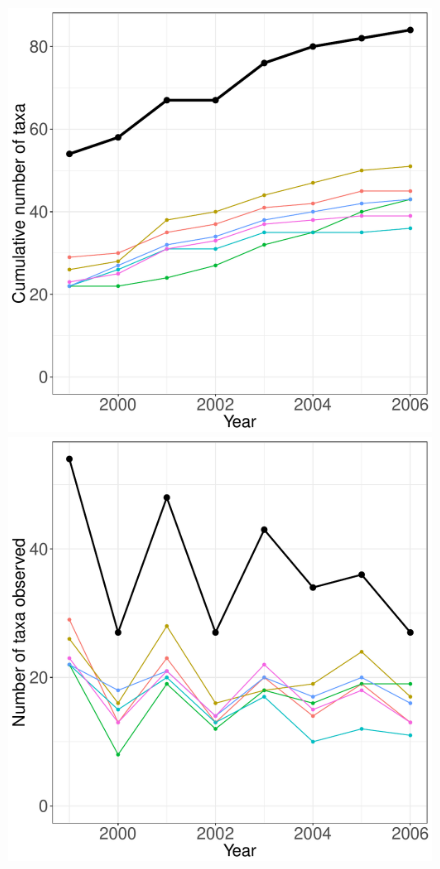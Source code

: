 \documentclass[11pt, oneside]{article}
\begin{document}
\begin{figure}[h!]
\centering
\includegraphics[scale = 0.4]{sgs-plants-catano_species_accumulation_curve.pdf}
\includegraphics[scale = 0.4]{sgs-plants-catano_num_taxa_over_time.pdf}

\end{figure}
\end{document}
